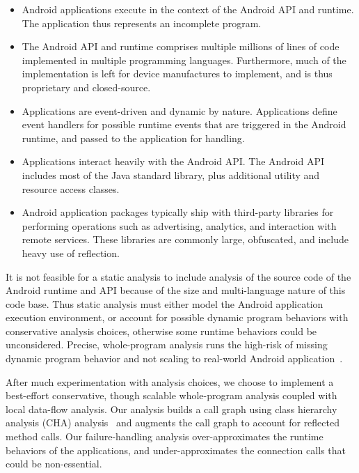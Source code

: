 \begin{itemize}

\item Android applications execute in the context of the Android API
  and runtime.  The application thus represents an incomplete program.
  
\item The Android API and runtime comprises multiple millions of lines of
  code implemented in multiple programming languages.  Furthermore,
  much of the implementation is left for device manufactures to
  implement, and is thus proprietary and closed-source. 

\item Applications are event-driven and dynamic by nature.
  Applications define event handlers for possible runtime events that
  are triggered in the Android runtime, and passed to the application
  for handling. 

\item Applications interact heavily with the Android API.  The Android
  API includes most of the Java standard library, plus additional
  utility and resource access classes.

\item Android application packages typically ship with third-party
  libraries for performing operations such as advertising, analytics,
  and interaction with remote services.  These libraries are commonly
  large, obfuscated, and include heavy use of reflection.

\end{itemize}

It is not feasible for a static analysis to include analysis of the
source code of the Android runtime and API because of the size and
multi-language nature of this code base.  Thus static analysis must
either model the Android application execution environment, or account
for possible dynamic program behaviors with conservative analysis
choices, otherwise some runtime behaviors could be unconsidered.
Precise, whole-program analysis runs the high-risk of missing dynamic
program behavior and not scaling to real-world Android
application~\cite{Gordon:Kim:Perkins:Gilham:Nguyen:Rinard:NDSS15}.

After much experimentation with analysis choices, we choose to
implement a best-effort conservative, though scalable whole-program
analysis coupled with local data-flow analysis. Our analysis builds a
call graph using class hierarchy analysis (CHA)
analysis~\cite{Dean1995} and augments the call graph to account for
reflected method calls.  Our failure-handling analysis
over-approximates the runtime behaviors of the applications, and
under-approximates the connection calls that could be non-essential.


